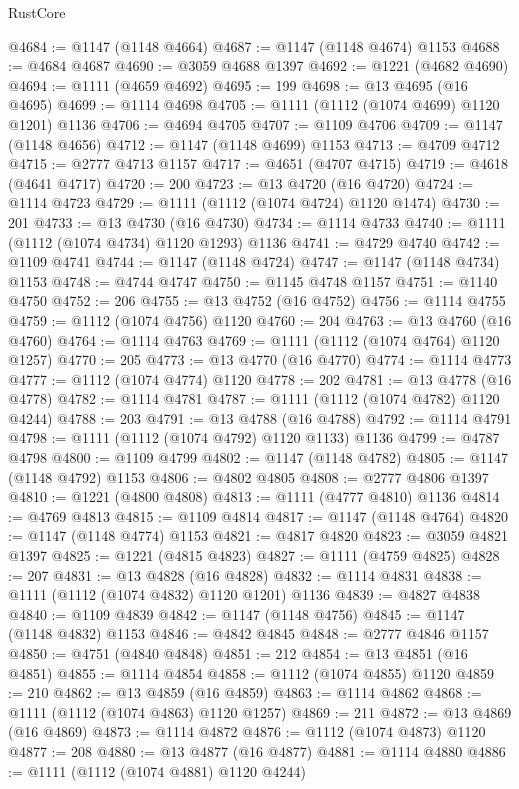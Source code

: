 \begin{lexlean}{RustCore}
\begin{coremodule}
@4684 := @1147 (@1148 @4664)
@4687 := @1147 (@1148 @4674) @1153
@4688 := @4684 @4687
@4690 := @3059 @4688 @1397
@4692 := @1221 (@4682 @4690)
@4694 := @1111 (@4659 @4692)
@4695 := 199
@4698 := @13 @4695 (@16 @4695)
@4699 := @1114 @4698
@4705 := @1111 (@1112 (@1074 @4699) @1120 @1201) @1136
@4706 := @4694 @4705
@4707 := @1109 @4706
@4709 := @1147 (@1148 @4656)
@4712 := @1147 (@1148 @4699) @1153
@4713 := @4709 @4712
@4715 := @2777 @4713 @1157
@4717 := @4651 (@4707 @4715)
@4719 := @4618 (@4641 @4717)
@4720 := 200
@4723 := @13 @4720 (@16 @4720)
@4724 := @1114 @4723
@4729 := @1111 (@1112 (@1074 @4724) @1120 @1474)
@4730 := 201
@4733 := @13 @4730 (@16 @4730)
@4734 := @1114 @4733
@4740 := @1111 (@1112 (@1074 @4734) @1120 @1293) @1136
@4741 := @4729 @4740
@4742 := @1109 @4741
@4744 := @1147 (@1148 @4724)
@4747 := @1147 (@1148 @4734) @1153
@4748 := @4744 @4747
@4750 := @1145 @4748 @1157
@4751 := @1140 @4750
@4752 := 206
@4755 := @13 @4752 (@16 @4752)
@4756 := @1114 @4755
@4759 := @1112 (@1074 @4756) @1120
@4760 := 204
@4763 := @13 @4760 (@16 @4760)
@4764 := @1114 @4763
@4769 := @1111 (@1112 (@1074 @4764) @1120 @1257)
@4770 := 205
@4773 := @13 @4770 (@16 @4770)
@4774 := @1114 @4773
@4777 := @1112 (@1074 @4774) @1120
@4778 := 202
@4781 := @13 @4778 (@16 @4778)
@4782 := @1114 @4781
@4787 := @1111 (@1112 (@1074 @4782) @1120 @4244)
@4788 := 203
@4791 := @13 @4788 (@16 @4788)
@4792 := @1114 @4791
@4798 := @1111 (@1112 (@1074 @4792) @1120 @1133) @1136
@4799 := @4787 @4798
@4800 := @1109 @4799
@4802 := @1147 (@1148 @4782)
@4805 := @1147 (@1148 @4792) @1153
@4806 := @4802 @4805
@4808 := @2777 @4806 @1397
@4810 := @1221 (@4800 @4808)
@4813 := @1111 (@4777 @4810) @1136
@4814 := @4769 @4813
@4815 := @1109 @4814
@4817 := @1147 (@1148 @4764)
@4820 := @1147 (@1148 @4774) @1153
@4821 := @4817 @4820
@4823 := @3059 @4821 @1397
@4825 := @1221 (@4815 @4823)
@4827 := @1111 (@4759 @4825)
@4828 := 207
@4831 := @13 @4828 (@16 @4828)
@4832 := @1114 @4831
@4838 := @1111 (@1112 (@1074 @4832) @1120 @1201) @1136
@4839 := @4827 @4838
@4840 := @1109 @4839
@4842 := @1147 (@1148 @4756)
@4845 := @1147 (@1148 @4832) @1153
@4846 := @4842 @4845
@4848 := @2777 @4846 @1157
@4850 := @4751 (@4840 @4848)
@4851 := 212
@4854 := @13 @4851 (@16 @4851)
@4855 := @1114 @4854
@4858 := @1112 (@1074 @4855) @1120
@4859 := 210
@4862 := @13 @4859 (@16 @4859)
@4863 := @1114 @4862
@4868 := @1111 (@1112 (@1074 @4863) @1120 @1257)
@4869 := 211
@4872 := @13 @4869 (@16 @4869)
@4873 := @1114 @4872
@4876 := @1112 (@1074 @4873) @1120
@4877 := 208
@4880 := @13 @4877 (@16 @4877)
@4881 := @1114 @4880
@4886 := @1111 (@1112 (@1074 @4881) @1120 @4244)

\end{coremodule}
\end{lexlean}
